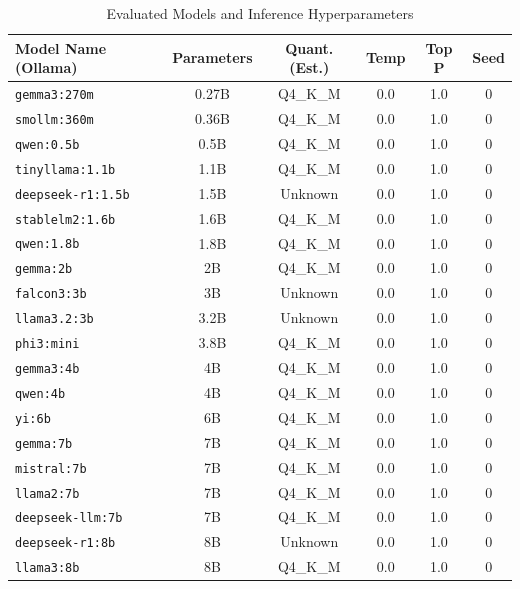\documentclass[11pt]{article}
\begin{document}
\begin{table}[htbp]
\centering
\caption{Evaluated Models and Inference Hyperparameters}
\label{tab:models}
\begin{tabular}{@{}lccccc@{}}
\hline
Model Name (Ollama) & Parameters & Quant. (Est.) & Temp & Top P & Seed \\ \hline
\texttt{gemma3:270m}      & 0.27B      & Q4\_K\_M              & 0.0     & 1.0   & 0    \\ 
\texttt{smollm:360m}      & 0.36B      & Q4\_K\_M              & 0.0     & 1.0   & 0    \\ 
\texttt{qwen:0.5b}        & 0.5B       & Q4\_K\_M              & 0.0     & 1.0   & 0    \\ 
\texttt{tinyllama:1.1b}   & 1.1B       & Q4\_K\_M              & 0.0     & 1.0   & 0    \\ 
\texttt{deepseek-r1:1.5b} & 1.5B       & Unknown               & 0.0     & 1.0   & 0    \\ 
\texttt{stablelm2:1.6b}   & 1.6B       & Q4\_K\_M              & 0.0     & 1.0   & 0    \\ 
\texttt{qwen:1.8b}        & 1.8B       & Q4\_K\_M              & 0.0     & 1.0   & 0    \\ 
\texttt{gemma:2b}         & 2B         & Q4\_K\_M              & 0.0     & 1.0   & 0    \\ 
\texttt{falcon3:3b}       & 3B         & Unknown               & 0.0     & 1.0   & 0    \\ 
\texttt{llama3.2:3b}      & 3.2B       & Unknown               & 0.0     & 1.0   & 0    \\ 
\texttt{phi3:mini}        & 3.8B       & Q4\_K\_M              & 0.0     & 1.0   & 0    \\ 
\texttt{gemma3:4b}        & 4B         & Q4\_K\_M              & 0.0     & 1.0   & 0    \\ 
\texttt{qwen:4b}          & 4B         & Q4\_K\_M              & 0.0     & 1.0   & 0    \\ 
\texttt{yi:6b}            & 6B         & Q4\_K\_M              & 0.0     & 1.0   & 0    \\ 
\texttt{gemma:7b}         & 7B         & Q4\_K\_M              & 0.0     & 1.0   & 0    \\ 
\texttt{mistral:7b}       & 7B         & Q4\_K\_M              & 0.0     & 1.0   & 0    \\ 
\texttt{llama2:7b}        & 7B         & Q4\_K\_M              & 0.0     & 1.0   & 0    \\ 
\texttt{deepseek-llm:7b}  & 7B         & Q4\_K\_M              & 0.0     & 1.0   & 0    \\ 
\texttt{deepseek-r1:8b}   & 8B         & Unknown               & 0.0     & 1.0   & 0    \\ 
\texttt{llama3:8b}        & 8B         & Q4\_K\_M              & 0.0     & 1.0   & 0    \\ \hline
\end{tabular}
\end{table}
\end{document}
